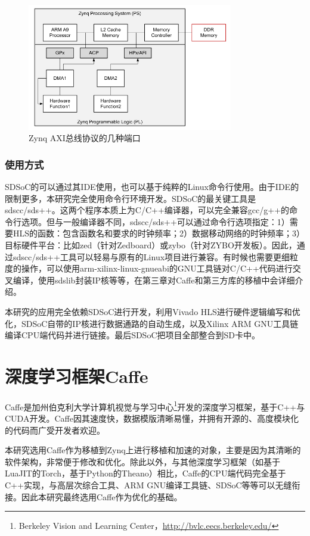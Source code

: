 \begin{figure}[!ht]
\centering
	\includegraphics[width=0.8\textwidth]{assets/imgs/zynq-axi}
\caption{Zynq AXI总线协议的几种端口}
\end{figure}

\subsubsection{使用方式}
SDSoC的可以通过其IDE使用，也可以基于纯粹的Linux命令行使用。由于IDE的限制更多，本研究完全使用命令行环境开发。SDSoC的最关键工具是sdscc/sds++。这两个程序本质上为C/C++编译器，可以完全兼容gcc/g++的命令行选项。但与一般编译器不同，sdscc/sds++可以通过命令行选项指定：1）需要HLS的函数：包含函数名和要求的时钟频率；2）数据移动网络的时钟频率；3）目标硬件平台：比如zed（针对Zedboard）或zybo（针对ZYBO开发板）。因此，通过sdscc/sds++工具可以轻易与原有的Linux项目进行兼容。有时候也需要更细粒度的操作，可以使用arm-xilinx-linux-gnueabi的GNU工具链对C/C++代码进行交叉编译，使用sdslib封装IP核等等，在第三章对Caffe和第三方库的移植中会详细介绍。

本研究的应用完全依赖SDSoC进行开发，利用Vivado HLS进行硬件逻辑编写和优化，SDSoC自带的IP核进行数据通路的自动生成，以及Xilinx ARM GNU工具链编译CPU端代码并进行链接。最后SDSoC把项目全部整合到SD卡中。

\section{深度学习框架Caffe}

Caffe\supercite{jia2014caffe}是加州伯克利大学计算机视觉与学习中心\footnote{Berkeley Vision and Learning Center，\url{http://bvlc.eecs.berkeley.edu/}}开发的深度学习框架，基于C++与CUDA开发。Caffe因其速度快，数据模版清晰易懂，并拥有开源的、高度模块化的代码而广受开发者欢迎。

本研究选用Caffe作为移植到Zynq上进行移植和加速的对象，主要是因为其清晰的软件架构，非常便于修改和优化。除此以外，与其他深度学习框架（如基于LuaJIT的Torch，基于Python的Theano）相比，Caffe的CPU端代码完全基于C++实现，与高层次综合工具、ARM GNU编译工具链、SDSoC等等可以无缝衔接。因此本研究最终选用Caffe作为优化的基础。

